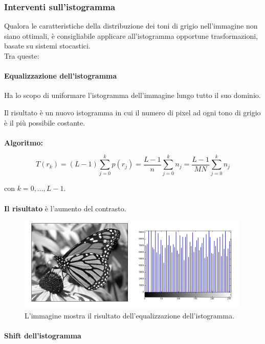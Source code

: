 \subsubsection{Interventi sull'istogramma}

Qualora le caratteristiche della distribuzione dei toni di grigio nell'immagine
non siano ottimali, è consigliabile applicare all'istogramma opportune
trasformazioni, basate su sistemi stocastici. \\Tra queste:

\paragraph{Equalizzazione dell'istogramma}

\begin{definition}
    Ha lo scopo di uniformare l'istogramma dell'immagine lungo tutto il suo
    dominio.
\end{definition}
Il risultato è un nuovo istogramma in cui il numero di pixel ad ogni tono di
grigio è il più possibile costante. \\\\
\textbf{Algoritmo:}

$$
    T(r_k) = (L-1)\sum_{j=0}^{k}p(r_j)=\frac{L-1}{n} \sum_{j=0}^{k}n_j = \frac{L-1}{MN}\sum_{j=0}^{k}n_j
$$

con $k=0,...,L-1$. \\\\
\textbf{Il risultato} è l'aumento del contrasto.

\begin{figure}[H]
    \centering
    \includegraphics[width=\linewidth, keepaspectratio]{capitoli/immagini/imgs/eq-istogramma.png}
    \caption{L'immagine mostra il risultato dell'equalizzazione dell'istogramma.}
\end{figure}
\paragraph{Shift dell'istogramma}

